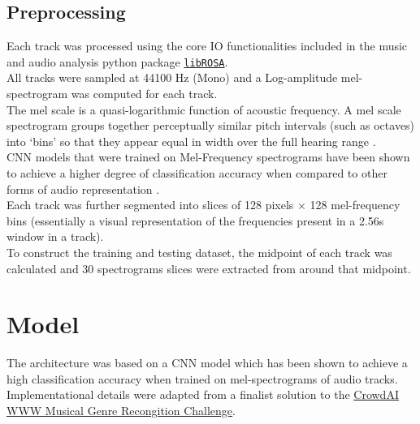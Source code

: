 \documentclass[12pt]{article}
\newcounter{ct}
\begin{document}
\subsection*{Preprocessing}
Each track was processed using the core IO functionalities included
in the music and audio analysis python package 
\href{http://librosa.github.io/librosa/}{\tt libROSA}\cite{c8}.\\
All tracks were sampled at 44100 Hz (Mono) and a 
Log-amplitude mel-spectrogram
was computed for each track.\\ 
The mel scale is a quasi-logarithmic function of acoustic frequency.
A mel scale spectrogram 
groups together perceptually similar 
pitch intervals (such as octaves) into `bins' so that
they appear equal in width over the full hearing range \cite{c9}.\\
CNN models that were trained on Mel-Frequency spectrograms
have been shown to achieve a higher degree
of classification accuracy when compared to other forms of audio
representation \cite{c6}.\\
Each track was further segmented into slices of 128 pixels $\times$
128 mel-frequency bins (essentially a visual representation 
of the frequencies present in a 2.56s window in a track).\\
To construct the training and testing dataset, the midpoint of 
each track was calculated and 30 spectrograms slices were extracted
from around that midpoint.
\begin{center}
\end{center}


\section*{Model}
The architecture was based on a CNN model which has been 
shown to achieve a high classification accuracy when trained on 
mel-spectrograms of audio tracks\cite{c4}.\\ Implementational details
were adapted from a finalist solution to the 
\href{https://www.crowdai.org/challenges/www-2018-challenge-learning-to-recognize-musical-genre}
{CrowdAI WWW Musical Genre Recongition Challenge}. 
\end{document}
